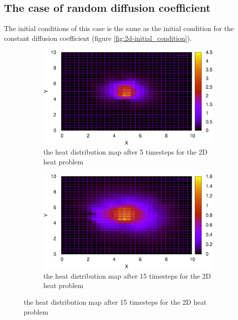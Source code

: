 \subsection{The case of random diffusion coefficient}
The initial conditions of this case is the same as the initial condition for the constant diffusion coefficient (figure \ref{fig:2d-initial_condition}). 
\\

\begin{figure}
     \centering
     \begin{subfigure}[b]{0.45\textwidth}
         \centering
         \includegraphics[width=\textwidth]{2DRandomDfig/05_map}
		\caption{the heat distribution map after 5 timesteps for the 2D heat problem}
		\label{fig:2d-randomD-5dt-map}
     \end{subfigure}
     \hfill
	\centering
     \begin{subfigure}[b]{0.45\textwidth}
         \centering
         \includegraphics[width=\textwidth]{2DRandomDfig/15_map}
		\caption{the heat distribution map after 15 timesteps for the 2D heat problem}
		\label{fig:2d-randomD-15dt-map}

\end{subfigure}
\end{figure}
